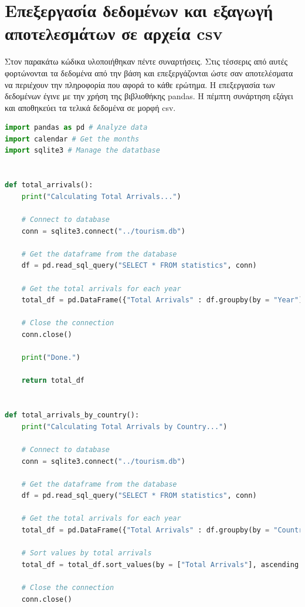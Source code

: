 \documentclass[a4paper]{article}
\begin{document}
\section{Επεξεργασία δεδομένων και εξαγωγή αποτελεσμάτων σε αρχεία \textlatin{csv}}

Στον παρακάτω κώδικα υλοποιήθηκαν πέντε συναρτήσεις. Στις τέσσερις από αυτές φορτώνονται τα δεδομένα από την βάση και επεξεργάζονται ώστε σαν αποτελέσματα να περιέχουν την πληροφορία που αφορά το κάθε ερώτημα. Η επεξεργασία των δεδομένων έγινε με την χρήση της βιβλιοθήκης \textlatin{pandas}. Η πέμπτη συνάρτηση εξάγει και αποθηκεύει τα τελικά δεδομένα σε μορφή \textlatin{csv}.


\begin{lstlisting}[language=Python, caption=dataframe.py]
import pandas as pd # Analyze data
import calendar # Get the months
import sqlite3 # Manage the datatbase


def total_arrivals():
    print("Calculating Total Arrivals...")

    # Connect to database
    conn = sqlite3.connect("../tourism.db")

    # Get the dataframe from the database
    df = pd.read_sql_query("SELECT * FROM statistics", conn)
    
    # Get the total arrivals for each year
    total_df = pd.DataFrame({"Total Arrivals" : df.groupby(by = "Year")[["Air", "Railway", "Sea", "Road"]].sum().sum(axis=1)}).reset_index()

    # Close the connection
    conn.close()

    print("Done.")

    return total_df


def total_arrivals_by_country():
    print("Calculating Total Arrivals by Country...")

    # Connect to database
    conn = sqlite3.connect("../tourism.db")

    # Get the dataframe from the database
    df = pd.read_sql_query("SELECT * FROM statistics", conn)
    
    # Get the total arrivals for each year
    total_df = pd.DataFrame({"Total Arrivals" : df.groupby(by = "Country")[["Air", "Railway", "Sea", "Road"]].sum().sum(axis=1)}).reset_index()
    
    # Sort values by total arrivals
    total_df = total_df.sort_values(by = ["Total Arrivals"], ascending = False).head(4)

    # Close the connection
    conn.close()


\end{lstlisting}
\end{document}
